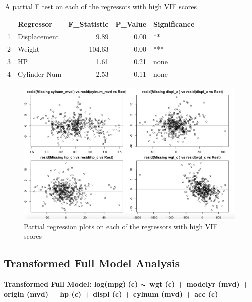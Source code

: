 \documentclass{article}
\newcommand{\mt}[1]{\ensuremath{#1}}
\newcommand{\tl}{\mt{\thicksim} }
\begin{document}
\clearpage
\newpage 

\begin{table}[ht]
\centering
\begin{tabular}{rlrrl}
  \hline
 & Regressor & F\_Statistic & P\_Value & Significance \\ 
  \hline
1 & Displacement & 9.89 & 0.00 & ** \\ 
  2 & Weight & 104.63 & 0.00 & *** \\ 
  3 & HP & 1.61 & 0.21 & none \\ 
  4 & Cylinder Num & 2.53 & 0.11 & none \\ 
   \hline
\end{tabular}
\caption{A partial F test on each of the regressors with high VIF scores}
\label{tab:partialfhighvif}
\end{table}

\begin{figure}
	\centering
	\includegraphics[width=1\linewidth]{11-14p_PrRgall4}
	\caption[Partial regression plots on high VIF regressors]
	{Partial regression plots on each of the regressors with high VIF scores}
\end{figure}

\clearpage
\newpage

\subsection{Transformed Full Model Analysis}

\textbf{Transformed Full Model: log(mpg) (c) \tl wgt (c) + modelyr (mvd) + origin (mvd) + hp (c) + displ (c) + cylnum (mvd) + acc (c)}

\clearpage
\newpage 
\end{document}
